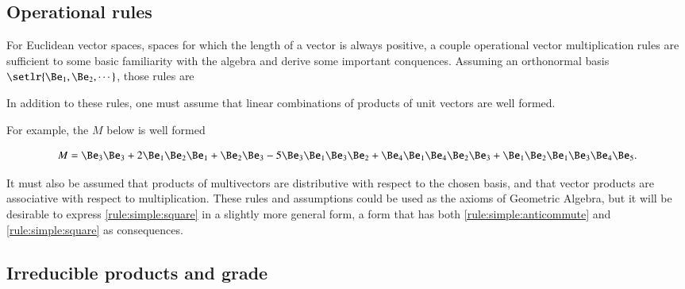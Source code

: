 \subsection{Operational rules}
For Euclidean vector spaces, spaces for which the length of a vector is always positive, a couple operational vector multiplication rules are sufficient to some basic familiarity with the algebra and derive some important conquences.
Assuming an orthonormal basis \( \setlr{ \Be_1, \Be_2, \cdots } \), those rules are



In addition to these rules, one must assume that linear combinations of products of unit vectors are well formed.

For example, the  \( M \) below is well formed

\begin{equation}\label{eqn:SimpleProducts:20}
M = \Be_3 \Be_3 + 2 \Be_1 \Be_2 \Be_1 + \Be_2 \Be_3 - 5 \Be_3 \Be_1 \Be_3 \Be_2 + \Be_4 \Be_1 \Be_4 \Be_2 \Be_3 + \Be_1 \Be_2 \Be_1 \Be_3 \Be_4 \Be_5.
\end{equation}

It must also be assumed that products of multivectors are distributive with respect to the chosen basis, and that vector products are associative with respect to multiplication.  These rules and assumptions could be used as the axioms of Geometric Algebra, but it will be desirable to express \ref{rule:simple:square} in a slightly more general form, a form that has both \ref{rule:simple:anticommute} and \ref{rule:simple:square} as consequences.

\subsection{Irreducible products and grade}


